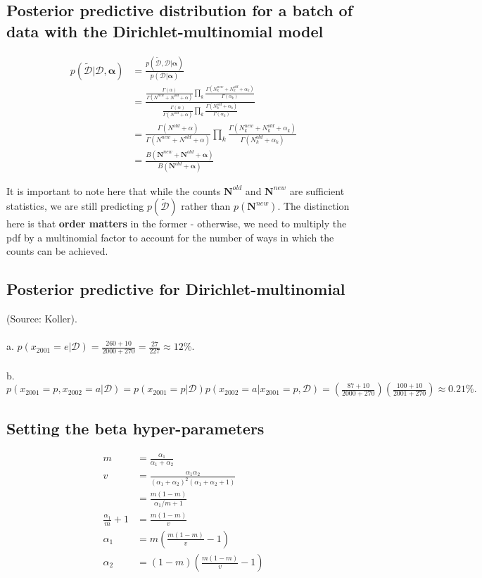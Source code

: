 \documentclass{article}
\begin{document}
\subsection{Posterior predictive distribution for a batch of data with the Dirichlet-multinomial model}
\begin{align*}
p(\tilde{\mathcal{D}}|\mathcal{D},\bm\alpha) &= \frac{p(\tilde{\mathcal{D}},\mathcal{D}|\bm\alpha)}{p(\mathcal{D}|\bm\alpha)}\\
&= \frac{
	\frac{\Gamma(\alpha)}{\Gamma(N^{new}+N^{old}+\alpha)} \prod_{k} \frac{\Gamma(N_k^{new}+N_k^{old}+\alpha_k)}{\Gamma(\alpha_k)}
}{
	\frac{\Gamma(\alpha)}{\Gamma(N^{old}+\alpha)} \prod_{k} \frac{\Gamma(N_k^{old}+\alpha_k)}{\Gamma(\alpha_k)}
}\\
&= \frac{\Gamma(N^{old}+\alpha)}{\Gamma(N^{new}+N^{old}+\alpha)} \prod_{k} \frac{\Gamma(N_k^{new}+N_k^{old}+\alpha_k)}{\Gamma(N_k^{old}+\alpha_k)}\\
&= \frac{B(\mathbf{N}^{new}+\mathbf{N}^{old}+\bm\alpha)}{B(\mathbf{N}^{old}+\bm\alpha)}
\end{align*}

It is important to note here that while the counts $\mathbf{N}^{old}$ and $\mathbf{N}^{new}$ are sufficient statistics, we are still predicting $p(\tilde{\mathcal{D}})$ rather than $p(\mathbf{N}^{new})$. The distinction here is that \textbf{order matters} in the former - otherwise, we need to multiply the pdf by a multinomial factor to account for the number of ways in which the counts can be achieved.

\subsection{Posterior predictive for Dirichlet-multinomial}
(Source: Koller).\\\\
a. $p(x_{2001}=e|\mathcal{D}) = \frac{260+10}{2000+270} = \frac{27}{227} \approx 12\%.$\\\\
b. $p(x_{2001}=p,x_{2002}=a|\mathcal{D}) = p(x_{2001}=p|\mathcal{D})p(x_{2002}=a|x_{2001}=p,\mathcal{D}) = \left(\frac{87+10}{2000+270}\right) \left(\frac{100+10}{2001+270}\right) \approx 0.21\%.$

\subsection{Setting the beta hyper-parameters}
\begin{align*}
m &= \frac{\alpha_1}{\alpha_1+\alpha_2}\\
v &= \frac{\alpha_1\alpha_2}{(\alpha_1+\alpha_2)^2(\alpha_1+\alpha_2+1)}\\
&= \frac{m(1-m)}{\alpha_1/m+1}\\
\frac{\alpha_1}{m}+1 &= \frac{m(1-m)}{v}\\
\alpha_1 &= m\left(\frac{m(1-m)}{v}-1\right)\\
\alpha_2 &= (1-m)\left(\frac{m(1-m)}{v}-1\right)
\end{align*}
\end{document}

